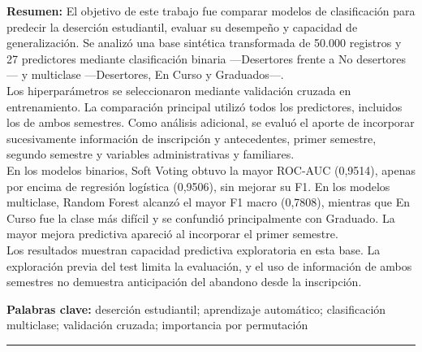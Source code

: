 \documentclass[10pt,a4paper]{article}
\begin{document}
\thispagestyle{primera}

\par\vspace{3pt}
\vspace{8pt}
\noindent{\bfseries {[}completar{]}}\par\vspace{2pt}
\par\vspace{12pt}

\noindent\begin{minipage}{\linewidth}
\setlength{\parindent}{1.5em}\small\justifying
\noindent\textbf{Resumen:} El objetivo de este trabajo fue comparar modelos de clasificación para predecir la deserción estudiantil, evaluar su
desempeño y capacidad de generalización. Se analizó una base sintética transformada de 50.000 registros y 27 predictores mediante clasificación
binaria ---Desertores frente a No desertores--- y multiclase ---Desertores, En Curso y Graduados---.\\
Los hiperparámetros se seleccionaron mediante validación cruzada en entrenamiento. La comparación principal utilizó todos los predictores, incluidos
los de ambos semestres. Como análisis adicional, se evaluó el aporte de incorporar sucesivamente información de inscripción y antecedentes, primer
semestre, segundo semestre y variables administrativas y familiares.\\
En los modelos binarios, Soft Voting obtuvo la mayor ROC-AUC (0,9514), apenas por encima de regresión logística (0,9506), sin mejorar su F1. En los
modelos multiclase, Random Forest alcanzó el mayor F1 macro (0,7808), mientras que En Curso fue la clase más difícil y se confundió principalmente con
Graduado. La mayor mejora predictiva apareció al incorporar el primer semestre.\\
Los resultados muestran capacidad predictiva exploratoria en esta base. La exploración previa del test limita la evaluación, y el uso de información
de ambos semestres no demuestra anticipación del abandono desde la inscripción.
\par\vspace{6pt}
\noindent\textbf{Palabras clave:} deserción estudiantil; aprendizaje automático; clasificación multiclase; validación cruzada; importancia por
permutación
\end{minipage}
\par\vspace{6pt}\noindent\rule{\linewidth}{0.4pt}\vspace{2pt}
\end{document}
